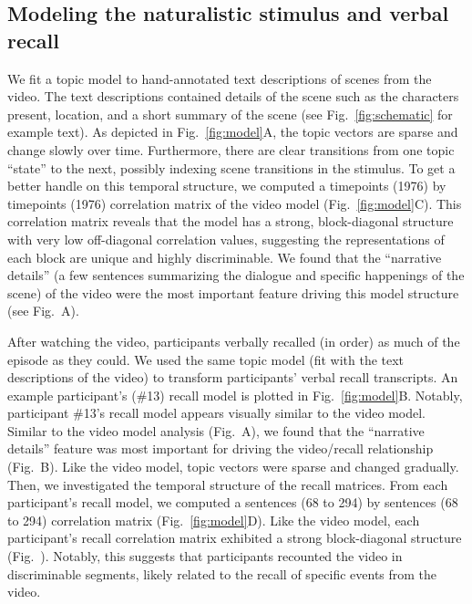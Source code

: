 \subsection*{Modeling the naturalistic stimulus and verbal recall}
We fit a topic model \citep{BleiEtal03} to hand-annotated text descriptions of scenes from the video. The text descriptions contained details of the scene such as the characters present, location, and a short summary of the scene (see Fig.~\ref{fig:schematic} for example text). As depicted in Fig.~\ref{fig:model}A, the topic vectors are sparse and change slowly over time. Furthermore, there are clear transitions from one topic ``state'' to the next, possibly indexing scene transitions in the stimulus. To get a better handle on this temporal structure, we computed a timepoints (1976) by timepoints (1976) correlation matrix of the video model (Fig.~\ref{fig:model}C).  This correlation matrix reveals that the model has a strong, block-diagonal structure with very low off-diagonal correlation values, suggesting the representations of each block are unique and highly discriminable. We found that the ``narrative details'' (a few sentences summarizing the dialogue and specific happenings of the scene) of the video were the most important feature driving this model structure (see Fig.~\featureimportance A).

After watching the video, participants verbally recalled (in order) as much of the episode as they could.  We used the same topic model (fit with the text descriptions of the video) to transform participants' verbal recall transcripts. An example participant's (\#13) recall model is plotted in Fig.~\ref{fig:model}B. Notably, participant \#13's recall model appears visually similar to the video model. Similar to the video model analysis (Fig.~\featureimportance A), we found that the ``narrative details'' feature was most important for driving the video/recall relationship (Fig.~\featureimportance B).  Like the video model, topic vectors were sparse and changed gradually.  Then, we investigated the temporal structure of the recall matrices. From each participant's recall model, we computed a sentences (68 to 294) by sentences (68 to 294) correlation matrix (Fig.~\ref{fig:model}D). Like the video model, each participant's recall correlation matrix exhibited a strong block-diagonal structure (Fig.~\corrmats). Notably, this suggests that participants recounted the video in discriminable segments, likely related to the recall of specific events from the video.




